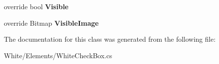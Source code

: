 \begin{DoxyCompactItemize}
\item 
\hypertarget{class_proto_test_1_1_golem_1_1_white_1_1_elements_1_1_white_check_box_a697a35c5561006bcb7c3ce86e1a472bf}{override bool {\bfseries Visible}}\label{class_proto_test_1_1_golem_1_1_white_1_1_elements_1_1_white_check_box_a697a35c5561006bcb7c3ce86e1a472bf}

\item 
\hypertarget{class_proto_test_1_1_golem_1_1_white_1_1_elements_1_1_white_check_box_aadd61203623912ce0e8e6dbffcc51f21}{override Bitmap {\bfseries Visible\-Image}}\label{class_proto_test_1_1_golem_1_1_white_1_1_elements_1_1_white_check_box_aadd61203623912ce0e8e6dbffcc51f21}

\end{DoxyCompactItemize}


The documentation for this class was generated from the following file\-:\begin{DoxyCompactItemize}
\item 
White/\-Elements/White\-Check\-Box.\-cs\end{DoxyCompactItemize}
